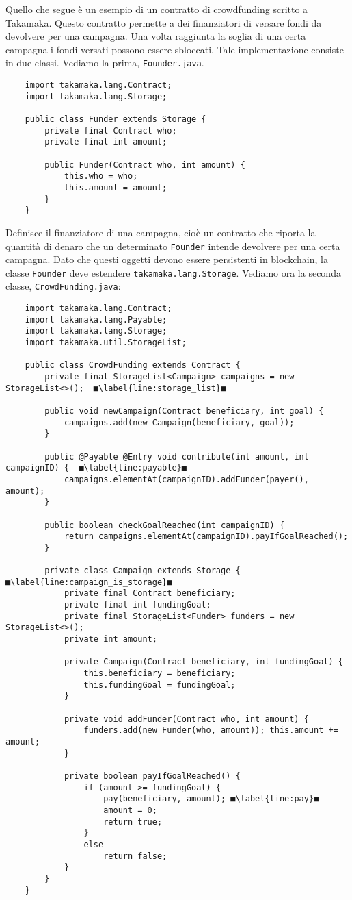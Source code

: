 Quello che segue è un esempio di un contratto di crowdfunding scritto a Takamaka. Questo contratto permette a dei finanziatori di versare fondi da devolvere per una campagna. Una volta raggiunta la soglia di una certa campagna i fondi versati possono essere sbloccati. Tale implementazione consiste in due classi. Vediamo la prima, \lstinline|Founder.java|.
%
\begin{lstlisting}
	import takamaka.lang.Contract;
	import takamaka.lang.Storage;
	
	public class Funder extends Storage {
		private final Contract who;
		private final int amount;
		
		public Funder(Contract who, int amount) {
			this.who = who;
			this.amount = amount;
		}
	}
\end{lstlisting}
%
Definisce il finanziatore di una campagna, cioè un contratto che riporta la quantità di denaro che un determinato \lstinline|Founder| intende devolvere per una certa campagna. Dato che questi oggetti devono essere persistenti in blockchain, la classe \lstinline|Founder| deve estendere \lstinline|takamaka.lang.Storage|. Vediamo ora la seconda classe, \lstinline|CrowdFunding.java|:
%
\begin{lstlisting}
	import takamaka.lang.Contract;
	import takamaka.lang.Payable;
	import takamaka.lang.Storage;
	import takamaka.util.StorageList;
	
	public class CrowdFunding extends Contract {
		private final StorageList<Campaign> campaigns = new StorageList<>();  ■\label{line:storage_list}■
		
		public void newCampaign(Contract beneficiary, int goal) {
			campaigns.add(new Campaign(beneficiary, goal));
		}
		
		public @Payable @Entry void contribute(int amount, int campaignID) {  ■\label{line:payable}■
			campaigns.elementAt(campaignID).addFunder(payer(), amount);
		}
		
		public boolean checkGoalReached(int campaignID) {
			return campaigns.elementAt(campaignID).payIfGoalReached();
		}
		
		private class Campaign extends Storage {  ■\label{line:campaign_is_storage}■
			private final Contract beneficiary;
			private final int fundingGoal;
			private final StorageList<Funder> funders = new StorageList<>();
			private int amount;
		
			private Campaign(Contract beneficiary, int fundingGoal) {
				this.beneficiary = beneficiary;
				this.fundingGoal = fundingGoal;
			}
		
			private void addFunder(Contract who, int amount) {
				funders.add(new Funder(who, amount)); this.amount += amount;
			}
		
			private boolean payIfGoalReached() {
				if (amount >= fundingGoal) {
					pay(beneficiary, amount); ■\label{line:pay}■
					amount = 0;
					return true;
				}
				else
					return false;
			}
		}
	}
\end{lstlisting}
